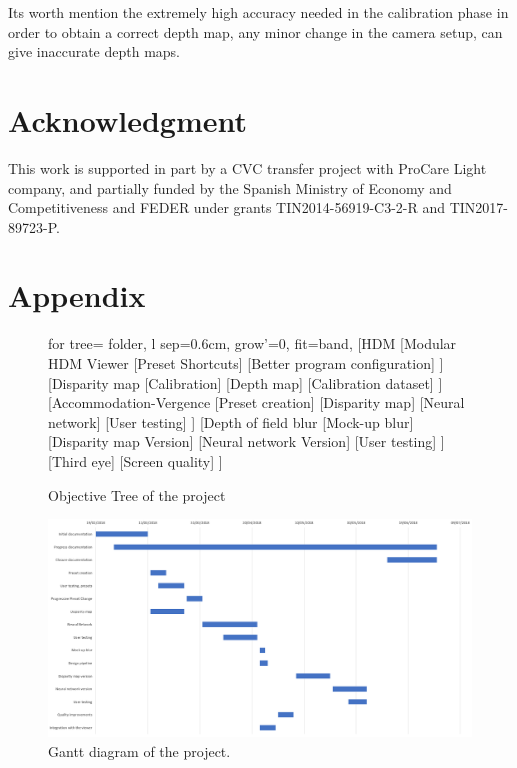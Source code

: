 \documentclass[10pt,a4paper,twocolumn,twoside]{article}
\begin{document}
	Its worth mention the extremely high accuracy needed in the calibration phase in order to obtain a correct depth map, any minor change in the camera setup, can give inaccurate depth maps.

	\section{Acknowledgment}
	This work is supported in part by a CVC transfer project with ProCare Light company, and partially funded by the Spanish Ministry of Economy and Competitiveness and FEDER under grants TIN2014-56919-C3-2-R and TIN2017-89723-P.
	
	
	
	
	\appendix
	
	\section*{Appendix}
	\begin{figure}
		\begin{forest}
			for tree={%
				folder,
				l sep=0.6cm,
				grow'=0,
				fit=band,
			}
			[HDM
			[Modular HDM Viewer
			[Preset Shortcuts]
			[Better program configuration]
			]
			[Disparity map
			[Calibration]
			[Depth map]
			[Calibration dataset]
			]
			[Accommodation-Vergence
			[Preset creation]
			[Disparity map]
			[Neural network]
			[User testing]
			]
			[Depth of field blur
			[Mock-up blur]
			[Disparity map Version]
			[Neural network Version]
			[User testing]
			]
			[Third eye]
			[Screen quality]
			]
		\end{forest}
		\caption{Objective Tree of the project}
		
		\label{fig:objective}
	\end{figure}
	
	\begin{landscape}
		\begin{figure}
			\centering
			\includegraphics[width=1\linewidth]{img/gantt}
			\caption{Gantt diagram of the project.}
			\label{fig:gantt}
		\end{figure}
		
	\end{landscape}
	
	
	
	
\end{document}
